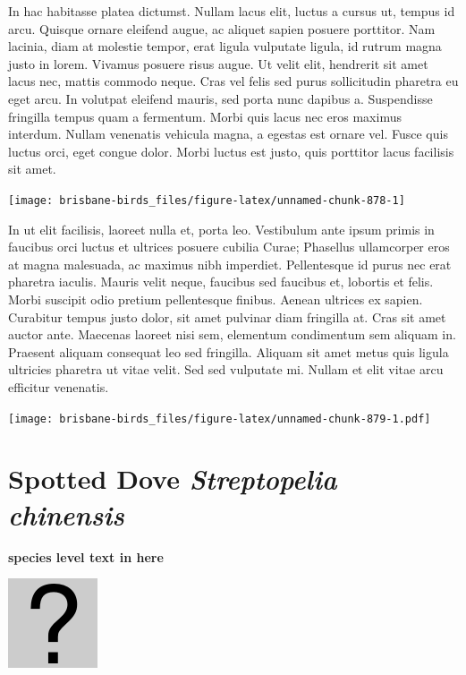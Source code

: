 \documentclass[]{book}
\let\origfigure\figure
\let\endorigfigure\endfigure
\renewenvironment{figure}[1][2] {
  \expandafter\origfigure\expandafter[H]
} {
  \endorigfigure
}
\begin{document}
In hac habitasse platea dictumst. Nullam lacus elit, luctus a cursus ut,
tempus id arcu. Quisque ornare eleifend augue, ac aliquet sapien posuere
porttitor. Nam lacinia, diam at molestie tempor, erat ligula vulputate
ligula, id rutrum magna justo in lorem. Vivamus posuere risus augue. Ut
velit elit, hendrerit sit amet lacus nec, mattis commodo neque. Cras vel
felis sed purus sollicitudin pharetra eu eget arcu. In volutpat eleifend
mauris, sed porta nunc dapibus a. Suspendisse fringilla tempus quam a
fermentum. Morbi quis lacus nec eros maximus interdum. Nullam venenatis
vehicula magna, a egestas est ornare vel. Fusce quis luctus orci, eget
congue dolor. Morbi luctus est justo, quis porttitor lacus facilisis sit
amet.

\begin{figure}
\texttt{[image: brisbane-birds\_files/figure-latex/unnamed-chunk-878-1]} \caption{insert figure caption}\label{fig:unnamed-chunk-878}
\end{figure}

In ut elit facilisis, laoreet nulla et, porta leo. Vestibulum ante ipsum
primis in faucibus orci luctus et ultrices posuere cubilia Curae;
Phasellus ullamcorper eros at magna malesuada, ac maximus nibh
imperdiet. Pellentesque id purus nec erat pharetra iaculis. Mauris velit
neque, faucibus sed faucibus et, lobortis et felis. Morbi suscipit odio
pretium pellentesque finibus. Aenean ultrices ex sapien. Curabitur
tempus justo dolor, sit amet pulvinar diam fringilla at. Cras sit amet
auctor ante. Maecenas laoreet nisi sem, elementum condimentum sem
aliquam in. Praesent aliquam consequat leo sed fringilla. Aliquam sit
amet metus quis ligula ultricies pharetra ut vitae velit. Sed sed
vulputate mi. Nullam et elit vitae arcu efficitur venenatis.

\begin{figure}
\centering
\texttt{[image: brisbane-birds\_files/figure-latex/unnamed-chunk-879-1.pdf]}
\caption{\label{fig:unnamed-chunk-879}insert figure caption}
\end{figure}

\section{\texorpdfstring{Spotted Dove \emph{Streptopelia
chinensis}}{Spotted Dove Streptopelia chinensis}}\label{spotted-dove-streptopelia-chinensis}

\textbf{species level text in here}

\begin{figure}
\centering
\includegraphics{assets/missing.png}
\caption{No image for species}
\end{figure}
\end{document}
